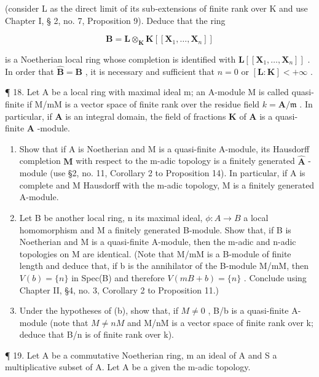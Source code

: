 (consider L as the direct limit of its sub-extensions of finite rank over K and use Chapter I, § 2, no. 7, Proposition 9). Deduce that the ring

\[
\mathbf {B} = \mathbf {L} \otimes_ {\mathbf {K}} \mathbf {K} [ [ \mathbf {X} _ {1}, \dots , \mathbf {X} _ {n} ] ]
\]

is a Noetherian local ring whose completion is identified with \(\mathbf{L}[[\mathbf{X}_1,\ldots ,\mathbf{X}_n]]\) . In order that \(\hat{\mathbf{B}} = \mathbf{B}\) , it is necessary and sufficient that \(n = 0\) or \([\mathbf{L}:\mathbf{K}] < +\infty\) .

¶ 18. Let A be a local ring with maximal ideal m; an A-module M is called quasi-finite if M/mM is a vector space of finite rank over the residue field \(k = \mathbf{A} / \mathfrak{m}\) . In particular, if \(\mathbf{A}\) is an integral domain, the field of fractions \(\mathbf{K}\) of \(\mathbf{A}\) is a quasi-finite \(\mathbf{A}\) -module.

\begin{enumerate}
\def\labelenumi{(\alph{enumi})}
\item
  Show that if A is Noetherian and M is a quasi-finite A-module, its Hausdorff completion \(\hat{\mathbf{M}}\) with respect to the m-adic topology is a finitely generated \(\hat{\mathbf{A}}\) -module (use §2, no. 11, Corollary 2 to Proposition 14). In particular, if A is complete and M Hausdorff with the m-adic topology, M is a finitely generated A-module.
\item
  Let B be another local ring, n its maximal ideal, \(\phi: A \rightarrow B\) a local homomorphism and M a finitely generated B-module. Show that, if B is Noetherian and M is a quasi-finite A-module, then the m-adic and n-adic topologies on M are identical. (Note that M/mM is a B-module of finite length and deduce that, if b is the annihilator of the B-module M/mM, then \(V(b) = \{n\}\) in Spec(B) and therefore \(V(mB + b) = \{n\}\) . Conclude using Chapter II, §4, no. 3, Corollary 2 to Proposition 11.)
\item
  Under the hypotheses of (b), show that, if \(M \neq 0\) , B/b is a quasi-finite A-module (note that \(M \neq nM\) and M/nM is a vector space of finite rank over k; deduce that B/n is of finite rank over k).
\end{enumerate}

¶ 19. Let A be a commutative Noetherian ring, m an ideal of A and S a multiplicative subset of A. Let A be a given the m-adic topology.

